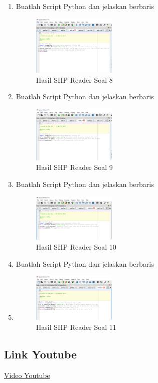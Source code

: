 \begin{enumerate}
    \item Buatlah Script Python dan jelaskan berbaris
    
    \hfill\break
    \begin{figure}[H]
		\includegraphics[width=4cm]{figures/1174017/3/soal8.PNG}
		\centering
		\caption{Hasil SHP Reader Soal 8}
    \end{figure}

    \item Buatlah Script Python dan jelaskan berbaris
    
    \hfill\break
    \begin{figure}[H]
		\includegraphics[width=4cm]{figures/1174017/3/soal9.PNG}
		\centering
		\caption{Hasil SHP Reader Soal 9}
    \end{figure}

    \item Buatlah Script Python dan jelaskan berbaris
    
    \hfill\break
    \begin{figure}[H]
		\includegraphics[width=4cm]{figures/1174017/3/soal10.PNG}
		\centering
		\caption{Hasil SHP Reader Soal 10}
    \end{figure}

    \item Buatlah Script Python dan jelaskan berbaris
    \item 
    \hfill\break
    \begin{figure}[H]
		\includegraphics[width=4cm]{figures/1174017/3/soal11.PNG}
		\centering
		\caption{Hasil SHP Reader Soal 11}
    \end{figure}
\end{enumerate}
\subsection{Link Youtube}
\href{https://youtu.be/7Lv9yq-ic8A}{Video Youtube}